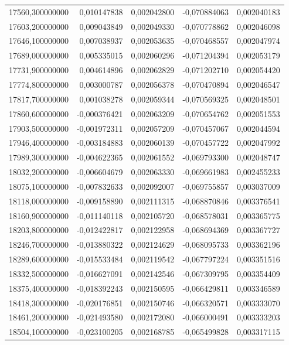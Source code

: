\begin{longtable}{rrrrr}
17560,300000000 & 0,010147838 & 0,002042800 & -0,070884063 & 0,002040183\\
17603,200000000 & 0,009043849 & 0,002049330 & -0,070778862 & 0,002046098\\
17646,100000000 & 0,007038937 & 0,002053635 & -0,070468557 & 0,002047974\\
17689,000000000 & 0,005335015 & 0,002060296 & -0,071204394 & 0,002053179\\
17731,900000000 & 0,004614896 & 0,002062829 & -0,071202710 & 0,002054420\\
17774,800000000 & 0,003000787 & 0,002056378 & -0,070470894 & 0,002046547\\
17817,700000000 & 0,001038278 & 0,002059344 & -0,070569325 & 0,002048501\\
17860,600000000 & -0,000376421 & 0,002063209 & -0,070654762 & 0,002051553\\
17903,500000000 & -0,001972311 & 0,002057209 & -0,070457067 & 0,002044594\\
17946,400000000 & -0,003184883 & 0,002060139 & -0,070457722 & 0,002047992\\
17989,300000000 & -0,004622365 & 0,002061552 & -0,069793300 & 0,002048747\\
18032,200000000 & -0,006604679 & 0,002063330 & -0,069661983 & 0,002455233\\
18075,100000000 & -0,007832633 & 0,002092007 & -0,069755857 & 0,003037009\\
18118,000000000 & -0,009158890 & 0,002111315 & -0,068870846 & 0,003376541\\
18160,900000000 & -0,011140118 & 0,002105720 & -0,068578031 & 0,003365775\\
18203,800000000 & -0,012422817 & 0,002122958 & -0,068694369 & 0,003367727\\
18246,700000000 & -0,013880322 & 0,002124629 & -0,068095733 & 0,003362196\\
18289,600000000 & -0,015533484 & 0,002119542 & -0,067797224 & 0,003351516\\
18332,500000000 & -0,016627091 & 0,002142546 & -0,067309795 & 0,003354409\\
18375,400000000 & -0,018392243 & 0,002150595 & -0,066429811 & 0,003346589\\
18418,300000000 & -0,020176851 & 0,002150746 & -0,066320571 & 0,003333070\\
18461,200000000 & -0,021493580 & 0,002172080 & -0,066000491 & 0,003333203\\
18504,100000000 & -0,023100205 & 0,002168785 & -0,065499828 & 0,003317115\\

\end{longtable}
